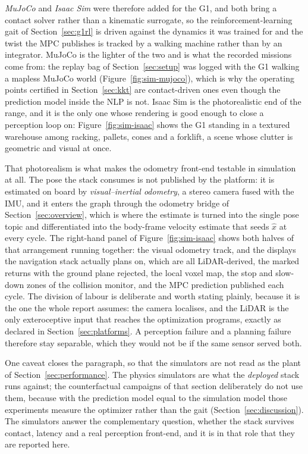 \documentclass[11pt,a4paper]{article}
\begin{document}
\emph{MuJoCo} and \emph{Isaac Sim} were therefore added for the G1, and both bring a contact solver rather
than a kinematic surrogate, so the reinforcement-learning gait of Section~\ref{sec:g1rl} is driven against
the dynamics it was trained for and the twist the MPC publishes is tracked by a walking machine rather than
by an integrator. MuJoCo is the lighter of the two and is what the recorded missions come from: the replay
bag \resBag{} of Section~\ref{sec:setup} was logged with the G1 walking a mapless MuJoCo world
(Figure~\ref{fig:sim-mujoco}), which is why the operating points certified in Section~\ref{sec:kkt} are
contact-driven ones even though the prediction model inside the NLP is not. Isaac Sim is the photorealistic
end of the range, and it is the only one whose rendering is good enough to close a perception loop on:
Figure~\ref{fig:sim-isaac} shows the G1 standing in a textured warehouse among racking, pallets, cones and a
forklift, a scene whose clutter is geometric and visual at once.

That photorealism is what makes the odometry front-end testable in simulation at all. The pose the stack
consumes is not published by the platform: it is estimated on board by \emph{visual--inertial odometry}, a
stereo camera fused with the IMU, and it enters the graph through the odometry bridge of
Section~\ref{sec:overview}, which is where the estimate is turned into the single pose topic and
differentiated into the body-frame velocity estimate that seeds $\hat x$ at every cycle. The right-hand panel
of Figure~\ref{fig:sim-isaac} shows both halves of that arrangement running together: the visual odometry
track, and the displays the navigation stack actually plans on, which are all LiDAR-derived, the marked
returns with the ground plane rejected, the local voxel map, the stop and slow-down zones of the collision
monitor, and the MPC prediction published each cycle. The division of labour is deliberate and worth stating
plainly, because it is the one the whole report assumes: the camera localises, and the LiDAR is the only
exteroceptive input that reaches the optimization programs, exactly as declared in
Section~\ref{sec:platforms}. A perception failure and a planning failure therefore stay separable, which they
would not be if the same sensor served both.

One caveat closes the paragraph, so that the simulators are not read as the plant of
Section~\ref{sec:performance}. The physics simulators are what the \emph{deployed} stack runs against; the
counterfactual campaigns of that section deliberately do not use them, because with the prediction model
equal to the simulation model those experiments measure the optimizer rather than the gait
(Section~\ref{sec:discussion}). The simulators answer the complementary question, whether the stack survives
contact, latency and a real perception front-end, and it is in that role that they are reported here.
\end{document}
